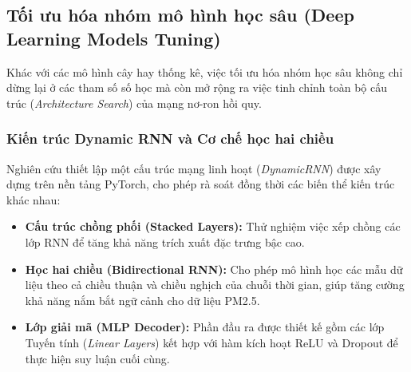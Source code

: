 \subsection{Tối ưu hóa nhóm mô hình học sâu (Deep Learning Models Tuning)}
Khác với các mô hình cây hay thống kê, việc tối ưu hóa nhóm học sâu không chỉ dừng lại ở các tham số số học mà còn mở rộng ra việc tinh chỉnh toàn bộ cấu trúc (\textit{Architecture Search}) của mạng nơ-ron hồi quy.
\subsubsection{Kiến trúc Dynamic RNN và Cơ chế học hai chiều}
Nghiên cứu thiết lập một cấu trúc mạng linh hoạt (\textit{DynamicRNN}) được xây dựng trên nền tảng PyTorch, cho phép rà soát đồng thời các biến thể kiến trúc khác nhau:
\begin{itemize}
    \item \textbf{Cấu trúc chồng phối (Stacked Layers):} Thử nghiệm việc xếp chồng các lớp RNN để tăng khả năng trích xuất đặc trưng bậc cao.
    \item \textbf{Học hai chiều (Bidirectional RNN):} Cho phép mô hình học các mẫu dữ liệu theo cả chiều thuận và chiều nghịch của chuỗi thời gian, giúp tăng cường khả năng nắm bắt ngữ cảnh cho dữ liệu PM2.5.
    \item \textbf{Lớp giải mã (MLP Decoder):} Phần đầu ra được thiết kế gồm các lớp Tuyến tính (\textit{Linear Layers}) kết hợp với hàm kích hoạt ReLU và Dropout để thực hiện suy luận cuối cùng.
\end{itemize}
